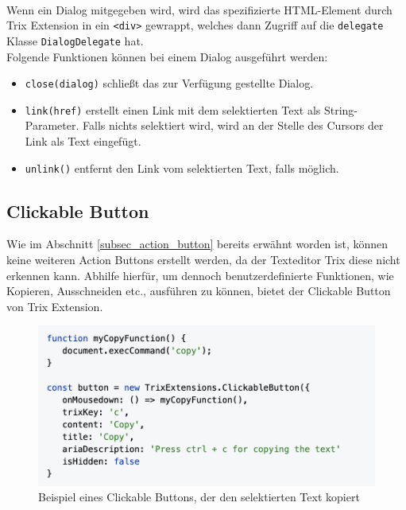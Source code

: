 \mbox{}\\
Wenn ein Dialog mitgegeben wird, wird das spezifizierte HTML-Element durch Trix Extension in ein \texttt{<div>} gewrappt, 
welches dann Zugriff auf die \texttt{delegate} Klasse \texttt{DialogDelegate} hat. \\
Folgende Funktionen können bei einem Dialog ausgeführt werden:

\begin{itemize}
	\item \texttt{close(dialog)} schließt das zur Verfügung gestellte Dialog.
	\item \texttt{link(href)} erstellt einen Link mit dem selektierten Text als String-Parameter. Falls nichts selektiert wird, wird an
		der Stelle des Cursors der Link als Text eingefügt.
	\item \texttt{unlink()} entfernt den Link vom selektierten Text, falls möglich.
\end{itemize}

\subsection{Clickable Button}
\label{subsec_clickable_button}

Wie im Abschnitt \ref{subsec_action_button} bereits erwähnt worden ist, können keine weiteren Action Buttons erstellt werden, da der Texteditor Trix diese nicht erkennen kann. Abhilfe hierfür, um dennoch benutzerdefinierte Funktionen, wie Kopieren, Ausschneiden etc., ausführen zu können, bietet der Clickable Button von Trix Extension.

\begin{figure}[H]
\begin{center}
	\includegraphics[scale=.7]{images/clickable-button-example.png}
\end{center}
	\caption{Beispiel eines Clickable Buttons, der den selektierten Text kopiert}
\end{figure}

